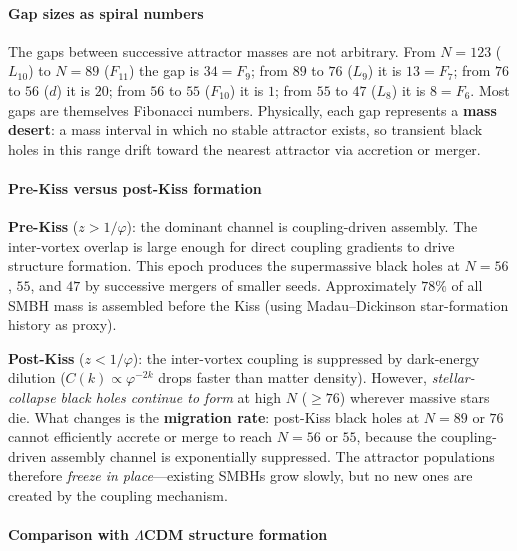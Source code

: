 \documentclass[12pt,a4paper]{article}
\begin{document}
\paragraph{Gap sizes as spiral numbers}

The gaps between successive attractor masses are not arbitrary.  From $N = 123$ ($L_{10}$) to $N = 89$ ($F_{11}$) the gap is $34 = F_9$; from $89$ to $76$ ($L_9$) it is $13 = F_7$; from $76$ to $56$ ($d$) it is $20$; from $56$ to $55$ ($F_{10}$) it is $1$; from $55$ to $47$ ($L_8$) it is $8 = F_6$.  Most gaps are themselves Fibonacci numbers.  Physically, each gap represents a \textbf{mass desert}: a mass interval in which no stable attractor exists, so transient black holes in this range drift toward the nearest attractor via accretion or merger.

\paragraph{Pre-Kiss versus post-Kiss formation}

\textbf{Pre-Kiss} ($z > 1/\varphi$): the dominant channel is coupling-driven assembly.  The inter-vortex overlap is large enough for direct coupling gradients to drive structure formation.  This epoch produces the supermassive black holes at $N = 56$, $55$, and $47$ by successive mergers of smaller seeds.  Approximately $78\%$ of all SMBH mass is assembled before the Kiss (using Madau--Dickinson star-formation history as proxy).

\textbf{Post-Kiss} ($z < 1/\varphi$): the inter-vortex coupling is suppressed by dark-energy dilution ($C(k) \propto \varphi^{-2k}$ drops faster than matter density).  However, \emph{stellar-collapse black holes continue to form} at high $N$ ($\geq 76$) wherever massive stars die.  What changes is the \textbf{migration rate}: post-Kiss black holes at $N = 89$ or $76$ cannot efficiently accrete or merge to reach $N = 56$ or $55$, because the coupling-driven assembly channel is exponentially suppressed.  The attractor populations therefore \emph{freeze in place}---existing SMBHs grow slowly, but no new ones are created by the coupling mechanism.

\paragraph{Comparison with $\Lambda$CDM structure formation}
\end{document}
